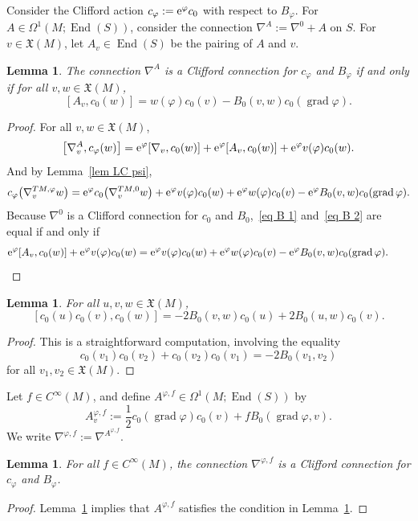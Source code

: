 \documentclass[10pt,a4paper]{amsart}
\numberwithin{equation}{section}
\newtheorem{Lemma}[Theorem]{Lemma}
\DeclareMathOperator{\grad}{grad}
\DeclareMathOperator{\End}{End}
\newcommand{\XX}{\mathfrak{X}}
\begin{document}
Consider the Clifford action $c_{\varphi} := {\rm e}^{\varphi}c_0$ with respect to $B_{\varphi}$.
For $A \in \Omega^1(M; \End(S))$, consider the connection $\nabla^A := \nabla^0 + A$ on $S$. For $v \in \XX(M)$, let $A_v \in \End(S)$ be the pairing of $A$ and $v$.
\begin{Lemma}\label{lem B}
The connection $\nabla^A$ is a Clifford connection for $c_{\varphi}$ and $B_{\varphi}$ if and only if for all $v,w \in \XX(M)$,
\[
[A_v, c_0(w)] = w(\varphi) c_0(v) - B_0(v,w) c_0(\grad \varphi).
\]
\end{Lemma}
\begin{proof}
For all $v,w \in \XX(M)$,
\begin{equation} \label{eq B 1}
\big[\nabla^A_v, c_{\varphi}(w)\big] = {\rm e}^{\varphi}[\nabla_v, c_0(w)] + {\rm e}^{\varphi}[A_v, c_0(w)] + {\rm e}^{\varphi}v(\varphi) c_0(w).
\end{equation}
And by Lemma~\ref{lem LC psi},
\begin{equation} \label{eq B 2}
c_{\varphi}\big(\nabla^{TM, \varphi}_v w\big) = {\rm e}^{\varphi}c_0\big(\nabla^{TM, 0}_v w\big) +
{\rm e}^{\varphi} v(\varphi) c_0(w) + {\rm e}^{\varphi}w(\varphi) c_0(v) - {\rm e}^{\varphi} B_0(v,w) c_0(\grad \varphi).
\end{equation}
Because $\nabla^0$ is a Clifford connection for $c_0$ and $B_0$,~\eqref{eq B 1} and~\eqref{eq B 2} are equal if and only if
\begin{equation*}
{\rm e}^{\varphi}[A_v, c_0(w)] + {\rm e}^{\varphi}v(\varphi) c_0(w) = {\rm e}^{\varphi} v(\varphi) c_0(w) + {\rm e}^{\varphi}w(\varphi) c_0(v) - {\rm e}^{\varphi} B_0(v,w) c_0(\grad \varphi).\tag*{\qed}
\end{equation*}
\renewcommand{\qed}{}
\end{proof}

\begin{Lemma}\label{lem cuvw}
For all $u,v,w \in \XX(M)$,
\[
[c_0(u)c_0(v), c_0(w)] = -2B_0(v,w) c_0(u) + 2 B_0(u,w) c_0(v).
\]
\end{Lemma}
\begin{proof}
This is a straightforward computation, involving the equality
\[
c_0(v_1)c_0(v_2) + c_0(v_2) c_0(v_1) = -2B_0(v_1, v_2)
\]
for all $v_1, v_2 \in \XX(M)$.
\end{proof}

Let $f \in C^{\infty}(M)$, and
define $A^{\varphi, f} \in \Omega^1(M; \End(S))$ by
\[
A^{\varphi, f}_v := \frac{1}{2}c_0(\grad \varphi)c_0(v) + fB_0(\grad \varphi, v).
\]
We write $\nabla^{\varphi,f} := \nabla^{A^{\varphi,f}}$.
\begin{Lemma}\label{lem Clifford psi}
For all $f \in C^{\infty}(M)$,
the connection $\nabla^{\varphi, f}$ is a Clifford connection for $c_{\varphi}$ and $B_{\varphi}$.
\end{Lemma}
\begin{proof}
Lemma~\ref{lem cuvw} implies that $A^{\varphi, f}$ satisfies the condition in Lemma~\ref{lem B}.
\end{proof}
\end{document}
